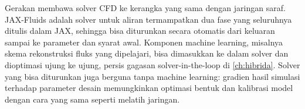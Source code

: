 Gerakan  membawa solver CFD ke kerangka yang sama dengan jaringan saraf. JAX-Fluids
\citep{bezgin2023} adalah solver untuk aliran termampatkan dua fase yang seluruhnya ditulis dalam JAX, sehingga bisa
diturunkan secara otomatis dari keluaran sampai ke parameter dan syarat awal. Komponen machine learning, misalnya skema
rekonstruksi fluks yang dipelajari, bisa dimasukkan ke dalam solver dan dioptimasi ujung ke ujung, persis gagasan
solver-in-the-loop di \cref{ch:hibrida}. Solver yang bisa diturunkan juga berguna tanpa machine learning: gradien hasil
simulasi terhadap parameter desain memungkinkan optimasi bentuk dan kalibrasi model dengan cara yang sama seperti melatih
jaringan.

